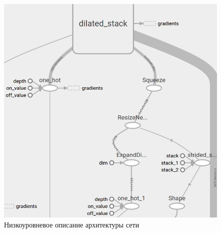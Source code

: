 \documentclass[../diploma.tex]{subfiles}
\begin{document}
\begin{figure}[ht!]
  \includegraphics[scale=0.6]{img/arch}
  \caption{Низкоуровневое описание архитектуры сети}
  \label{fig:arch_low}
\end{figure}

\newpage
\pagebreak
\end{document}
